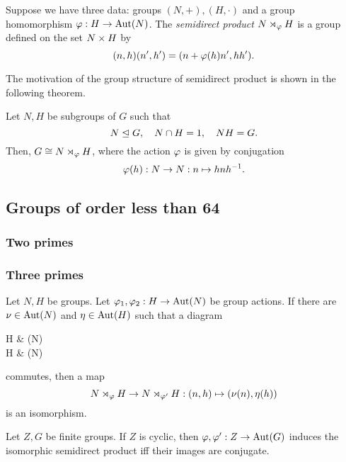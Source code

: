 \documentclass{../exp}
\begin{document}
\begin{defn}
Suppose we have three data: groups $(N,+),(H,\cdot)$ and a group homomorphism $\f:H\to\Aut(N)$.
The \emph{semidirect product} $N\rtimes_\varphi H$ is a group defined on the set $N\times H$ by
\[(n,h)(n',h')=(n+\varphi(h)n',hh').\]
\end{defn}
The motivation of the group structure of semidirect product is shown in the following theorem.
\begin{thm}
Let $N,H$ be subgroups of $G$ such that
\[N\trianglelefteq G,\quad N\cap H=1,\quad NH=G.\]
Then, $G\cong N\rtimes_\varphi H$, where the action $\varphi$ is given by conjugation
\[\f(h):N\to N:n\mapsto hnh^{-1}.\]
\end{thm}




\subsection{Groups of order less than 64}


\subsubsection{Two primes}
\begin{ex}[$|G|=p^2$]
\end{ex}

\begin{ex}[$|G|=pq$]
\end{ex}




\subsubsection{Three primes}
\begin{lem}
Let $N,H$ be groups.
Let $\f_1,\f_2:H\to\Aut(N)$ be group actions.
If there are $\nu\in\operatorname{Aut}(N)$ and $\eta\in\operatorname{Aut}(H)$ such that a diagram
\begin{cd}
H  & \Aut(N) \\
H  & \Aut(N)
\end{cd}
commutes, then a map
\[N\rtimes_\f H\to N\rtimes_{\f'}H:(n,h)\mapsto(\nu(n),\eta(h))\]
is an isomorphism.
\end{lem}
\begin{lem}
Let $Z,G$ be finite groups.
If $Z$ is cyclic, then $\f,\f':Z\to\Aut(G)$ induces the isomorphic semidirect product iff their images are conjugate.
\end{lem}
\end{document}
